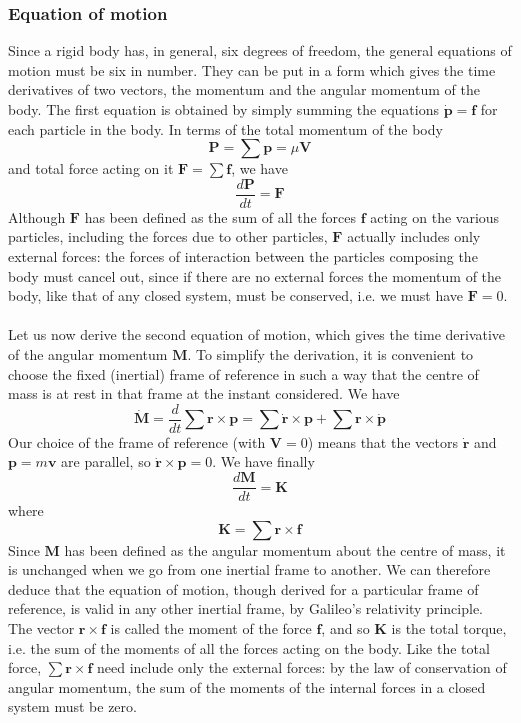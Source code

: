 \subsubsection{Equation of motion}
Since a rigid body has, in general, six degrees of freedom, the general equations of motion must be six in number. They can be put in a form which gives the time derivatives of two vectors, the momentum and the angular momentum of the body.
The first equation is obtained by simply summing the equations $\dot{\bm{p}} = \bm{f}$ for each particle in the body. In terms of the total momentum of the body
\[\bm{P} = \sum \bm{p} = \mu\bm{V}\]
and total force acting on it $\bm{F} = \sum \bm{f}$, we have
\[\frac{d\bm{P}}{dt} = \bm{F}\]
Although $\bm{F}$ has been defined as the sum of all the forces $\bm{f}$ acting on the various particles, including the forces due to other particles, $\bm{F}$ actually includes only external forces: the forces of interaction between the particles composing the body must cancel out, since if there are no external forces the momentum of the body, like that of any closed system, must be conserved, i.e. we must have $\bm{F} = 0$. \\ \\
Let us now derive the second equation of motion, which gives the time derivative of the angular momentum $\bm{M}$. 
To simplify the derivation, it is convenient to choose the fixed (inertial) frame of reference in such a way that the centre of mass is at rest in that frame at the instant considered. We have
\[\dot{\bm{M}} = \frac{d}{dt} \sum \bm{r} \times \bm{p} = \sum \bm{\dot{r}} \times \bm{p} + \sum \bm{r} \times \dot{\bm{p}}\]
Our choice of the frame of reference (with $\bm{V} = 0$) means that the vectors $\dot{\bm{r}}$ and $\bm{p} = m\bm{v}$ are parallel, so $\dot{\bm{r}} \times \bm{p} = 0$. We have finally
\[\frac{d\bm{M}}{dt} = \bm{K}\]
where
\[\bm{K} = \sum \bm{r} \times \bm{f}\]
Since $\bm{M}$ has been defined as the angular momentum about the centre of mass, it is unchanged when we go from one inertial frame to another. We can therefore deduce that the equation of motion, though derived for a particular frame of reference, is valid in any other inertial frame, by Galileo's relativity principle.\\
The vector $\bm{r}\times \bm{f}$ is called the moment of the force $\bm{f}$, and so $\bm{K}$ is the total torque, i.e. the sum of the moments of all the forces acting on the body. Like the total force, $\sum \bm{r} \times \bm{f}$ need include only the external forces: by the law of conservation of angular momentum, the sum of the moments of the internal forces in a closed system must be zero.

